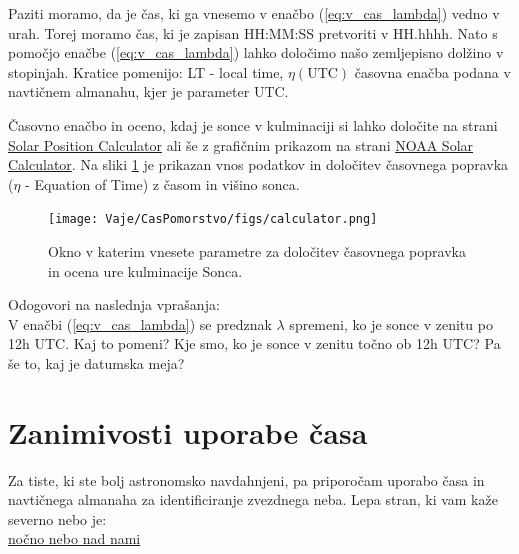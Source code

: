Paziti moramo, da je čas, ki ga vnesemo v enačbo (\ref{eq:v_cas_lambda}) vedno v urah. Torej moramo čas, ki je zapisan HH:MM:SS pretvoriti v HH.hhhh. Nato s pomočjo enačbe (\ref{eq:v_cas_lambda}) lahko določimo našo zemljepisno dolžino v stopinjah. Kratice pomenijo: LT - local time, $\eta(\text{UTC})$ časovna enačba podana v navtičnem almanahu, kjer je parameter UTC.

Časovno enačbo in oceno, kdaj je sonce v kulminaciji si lahko določite na strani \href{https://www.esrl.noaa.gov/gmd/grad/solcalc/azel.html}{Solar Position Calculator} ali še z grafičnim prikazom na strani \href{https://www.esrl.noaa.gov/gmd/grad/solcalc/}{NOAA Solar Calculator}. Na sliki \ref{fig:v_cas_calculator} je prikazan vnos podatkov in določitev časovnega popravka ($\eta$ - Equation of Time) z časom in višino sonca.
%
\begin{figure}[tbph!]
	\centering \texttt{[image: Vaje/CasPomorstvo/figs/calculator.png]}
	\caption{Okno v katerim vnesete parametre za določitev časovnega popravka in ocena ure kulminacije Sonca.}
	\label{fig:v_cas_calculator}
\end{figure}

%
Odogovori na naslednja vprašanja:\\[2mm]
V enačbi (\ref{eq:v_cas_lambda}) se predznak $\lambda$ spremeni, ko je sonce v zenitu po 12h UTC. Kaj to pomeni? Kje smo, ko je sonce v zenitu točno ob 12h UTC? Pa še to, kaj je datumska meja?

\section{Zanimivosti uporabe časa}
Za tiste, ki ste bolj astronomsko navdahnjeni, pa priporočam uporabo časa in navtičnega almanaha za identificiranje zvezdnega neba. Lepa stran, ki vam kaže severno nebo je:\\[2mm]
%
\href{http://www.jodcast.net/sky}{nočno nebo nad nami}
%
